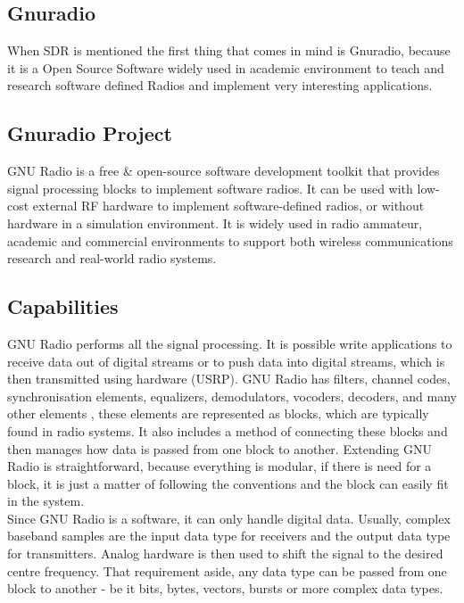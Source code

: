\subsection{Gnuradio}

When SDR is mentioned the first thing that comes in mind is Gnuradio, because it
is a Open Source Software widely used in academic environment to teach and
research software defined Radios and implement very interesting applications.

\subsection{Gnuradio Project}


GNU Radio is a free \& open-source software development toolkit that provides
signal processing blocks to implement software radios. It can be used with
low-cost external RF hardware to implement software-defined radios, or without
hardware in a simulation environment. It is widely used in radio ammateur,
academic and commercial environments to support both wireless communications
research and real-world radio systems.

\subsection{Capabilities}

GNU Radio performs all the signal processing. It is possible write applications
to receive data out of digital streams or to push data into digital streams,
which is then transmitted using hardware (USRP). GNU Radio has filters, channel
codes, synchronisation elements, equalizers, demodulators, vocoders, decoders,
and many other elements , these elements are represented as blocks, which are
typically found in radio systems. It also includes a method of connecting these
blocks and then manages how data is passed from one block to another. Extending
GNU Radio is straightforward, because everything is modular, if there is need
for a block, it is just a matter of following the conventions and the block can
easily fit in the system.\\

Since GNU Radio is a software, it can only handle digital data. Usually, complex
baseband samples are the input data type for receivers and the output data type
for transmitters. Analog hardware is then used to shift the signal to the
desired centre frequency. That requirement aside, any data type can be passed
from one block to another - be it bits, bytes, vectors, bursts or more complex
data types.\\


